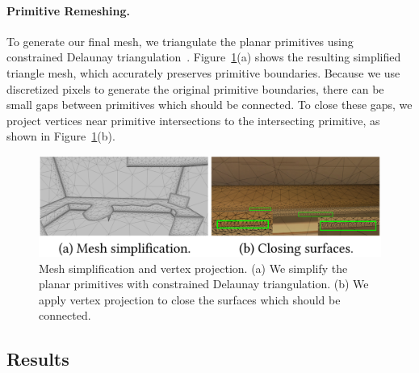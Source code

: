 \paragraph*{Primitive Remeshing.}
To generate our final mesh, we triangulate the planar primitives using constrained Delaunay triangulation~\cite{chew1987constrained}. 
Figure~\ref{fig:3dlite-remesh}(a) shows the resulting simplified triangle mesh, which accurately preserves primitive boundaries.
Because we use discretized pixels to generate the original primitive boundaries, there can be small gaps between primitives which should be connected. 
To close these gaps, we project vertices near primitive intersections to the intersecting primitive, as shown in Figure~\ref{fig:3dlite-remesh}(b).
\begin{figure}
\centering
\includegraphics[width=0.8\linewidth]{3dlite/fig12.png}
\caption{Mesh simplification and vertex projection. (a) We simplify the planar primitives with constrained Delaunay triangulation. (b) We apply vertex projection to close the surfaces which should be connected.}
\label{fig:3dlite-remesh}
\end{figure}


\subsection{Results}
\label{sec:results}

